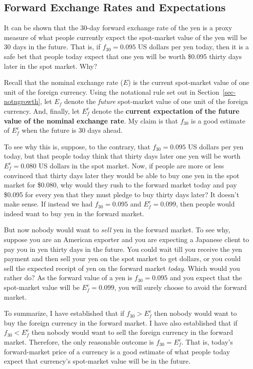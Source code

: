 \documentclass[
  letterpaper,
]{book}
\begin{document}
\subsection{Forward Exchange Rates and
Expectations}\label{sec-forward-exp}

It can be shown that the 30-day forward exchange rate of the yen is a
proxy measure of what people currently expect the spot-market value of
the yen will be 30 days in the future. That is, if \(f_{30} = 0.095\) US
dollars per yen today, then it is a safe bet that people today expect
that one yen will be worth \$0.095 thirty days later in the spot market.
Why?

Recall that the nominal exchange rate (\(E\)) is the current spot-market
value of one unit of the foreign currency. Using the notational rule set
out in Section~\ref{sec-notngrowth}, let \(E_f\) denote the
\emph{future} spot-market value of one unit of the foreign currency.
And, finally, let \(E_f^e\) denote the \textbf{current expectation of
the future value of the nominal exchange rate}. My claim is that
\(f_{30}\) is a good estimate of \(E_f^e\) when the future is 30 days
ahead.

To see why this is, suppose, to the contrary, that \(f_{30} = 0.095\) US
dollars per yen today, but that people today think that thirty days
later one yen will be worth \(E_f^e =0.080\) US dollars in the spot
market. Now, if people are more or less convinced that thirty days later
they would be able to buy one yen in the spot market for \$0.080, why
would they rush to the forward market today and pay \$0.095 for every
yen that they must pledge to buy thirty days later? It doesn't make
sense. If instead we had \(f_{30} = 0.095\) and \(E_f^e =0.099\), then
people would indeed want to buy yen in the forward market.

But now nobody would want to \emph{sell} yen in the forward market. To
see why, suppose you are an American exporter and you are expecting a
Japanese client to pay you in yen thirty days in the future. You could
wait till you receive the yen payment and then sell your yen on the spot
market to get dollars, or you could sell the expected receipt of yen on
the forward market \emph{today}. Which would you rather do? As the
forward value of a yen is \(f_{30} = 0.095\) and you expect that the
spot-market value will be \(E_f^e =0.099\), you will surely choose to
avoid the forward market.

To summarize, I have established that if \(f_{30} > E_f^e\) then nobody
would want to buy the foreign currency in the forward market. I have
also established that if \(f_{30} < E_f^e\) then nobody would want to
sell the foreign currency in the forward market. Therefore, the only
reasonable outcome is \(f_{30} = E_f^e\). That is, today's
forward-market price of a currency is a good estimate of what people
today expect that currency's spot-market value will be in the future.
\end{document}

